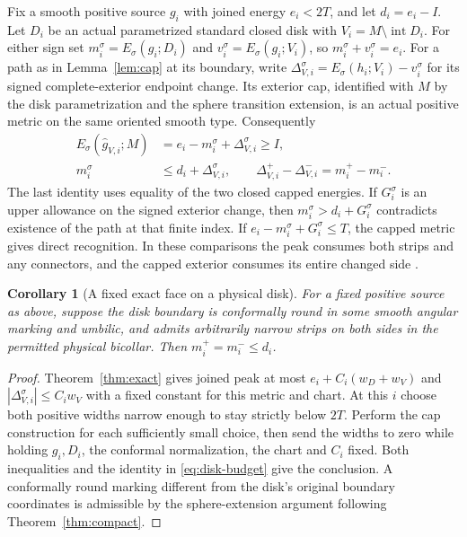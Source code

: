 \documentclass[11pt,letterpaper]{article}
\numberwithin{equation}{section}
\newtheorem{corollary}[theorem]{Corollary}
\begin{document}
Fix a smooth positive source \(g_i\) with joined energy
\(e_i<2T\), and let \(d_i=e_i-I\). Let \(D_i\) be an
actual parametrized standard closed disk with
\(V_i=M\setminus\operatorname{int}D_i\). For either sign set
\(m_i^\sigma=E_\sigma(g_i;D_i)\) and
\(v_i^\sigma=E_\sigma(g_i;V_i)\), so \(m_i^\sigma+v_i^\sigma=e_i\).
For a path as in Lemma~\ref{lem:cap} at its boundary, write
\(\Delta_{V,i}^\sigma=E_\sigma(h_i;V_i)-v_i^\sigma\) for its
signed complete-exterior endpoint change. Its exterior cap,
identified with \(M\) by the disk parametrization and the
sphere transition extension, is an actual positive metric on
the same oriented smooth type. Consequently
\begin{equation}
 \begin{aligned}
 E_\sigma(\widehat g_{V,i};M)
   &=e_i-m_i^\sigma+\Delta_{V,i}^\sigma\ge I,\\
 m_i^\sigma&\le d_i+\Delta_{V,i}^\sigma,\qquad
 \Delta_{V,i}^+-\Delta_{V,i}^-=m_i^+-m_i^- .
 \end{aligned}
 \label{eq:disk-budget}
\end{equation}
The last identity uses equality of the two closed capped energies.
If \(G_i^\sigma\) is an upper allowance on the signed exterior
change, then \(m_i^\sigma>d_i+G_i^\sigma\) contradicts existence
of the path at that finite index. If
\(e_i-m_i^\sigma+G_i^\sigma\le T\), the capped metric gives
direct recognition. In these comparisons the peak consumes both
strips and any connectors, and the capped exterior consumes its
entire changed side \cite[Simultaneous removal of marked standard disks]{Baker2026FixedDescent}.

\begin{corollary}[A fixed exact face on a physical disk]\label{cor:fixed}
For a fixed positive source as above, suppose the disk boundary
is conformally round in some smooth angular marking and umbilic,
and admits arbitrarily narrow strips on both sides in the permitted
physical bicollar. Then \(m_i^+=m_i^-\le d_i\).
\end{corollary}

\begin{proof}
Theorem~\ref{thm:exact} gives joined peak at most
\(e_i+C_i(w_D+w_V)\) and \(|\Delta_{V,i}^\sigma|\le C_iw_V\)
with a fixed constant for this metric and chart. At this \(i\)
choose both positive widths narrow enough to stay strictly below
\(2T\). Perform the cap construction for each sufficiently small
choice, then send the widths to zero while holding \(g_i,D_i\),
the conformal normalization, the chart and \(C_i\) fixed.
Both inequalities and the identity in \eqref{eq:disk-budget}
give the conclusion. A conformally round marking different
from the disk's original boundary coordinates is admissible by
the sphere-extension argument following Theorem~\ref{thm:compact}.
\end{proof}
\end{document}
